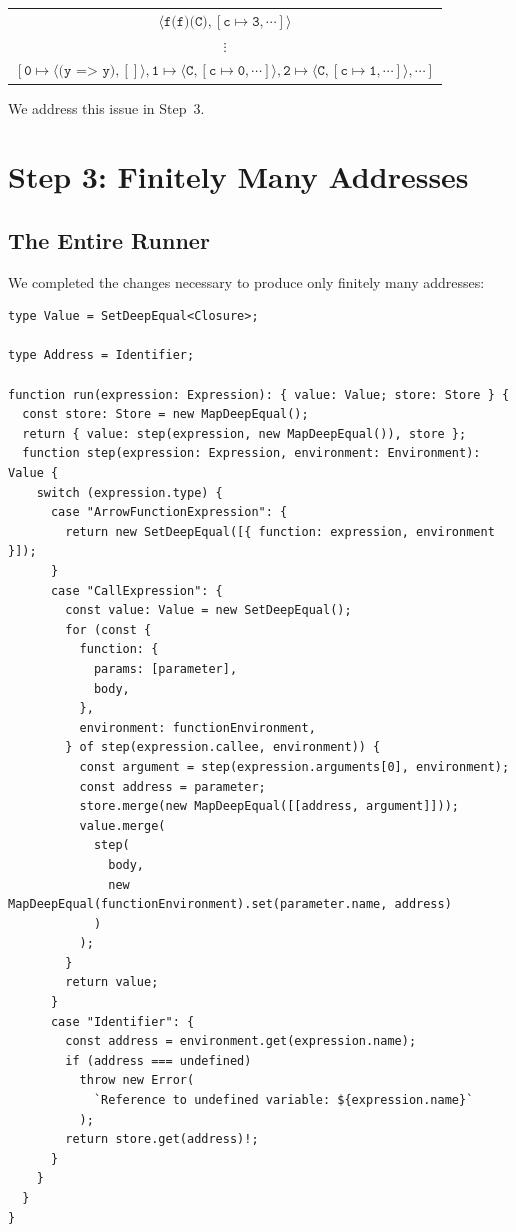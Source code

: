 \documentclass[12pt, oneside]{book}
\begin{document}
\begin{center}
\begin{tabular}{l}
\multicolumn{1}{c}{$\langle \texttt{f(f)(C)}, [\texttt{c} \mapsto \texttt{3}, \cdots] \rangle$} \\
\multicolumn{1}{c}{$\vdots$} \\
\multicolumn{1}{c}{$[\texttt{0} \mapsto \langle \texttt{(y => y)}, [] \rangle, \texttt{1} \mapsto \langle \texttt{C}, [\texttt{c} \mapsto \texttt{0}, \cdots] \rangle, \texttt{2} \mapsto \langle \texttt{C}, [\texttt{c} \mapsto \texttt{1}, \cdots] \rangle, \cdots]$}
\end{tabular}
\end{center}

We address this issue in Step~3.

\section{Step 3: Finitely Many Addresses}

\subsection{The Entire Runner}

We completed the changes necessary to produce only finitely many addresses:

\begin{verbatim}
type Value = SetDeepEqual<Closure>;

type Address = Identifier;

function run(expression: Expression): { value: Value; store: Store } {
  const store: Store = new MapDeepEqual();
  return { value: step(expression, new MapDeepEqual()), store };
  function step(expression: Expression, environment: Environment): Value {
    switch (expression.type) {
      case "ArrowFunctionExpression": {
        return new SetDeepEqual([{ function: expression, environment }]);
      }
      case "CallExpression": {
        const value: Value = new SetDeepEqual();
        for (const {
          function: {
            params: [parameter],
            body,
          },
          environment: functionEnvironment,
        } of step(expression.callee, environment)) {
          const argument = step(expression.arguments[0], environment);
          const address = parameter;
          store.merge(new MapDeepEqual([[address, argument]]));
          value.merge(
            step(
              body,
              new MapDeepEqual(functionEnvironment).set(parameter.name, address)
            )
          );
        }
        return value;
      }
      case "Identifier": {
        const address = environment.get(expression.name);
        if (address === undefined)
          throw new Error(
            `Reference to undefined variable: ${expression.name}`
          );
        return store.get(address)!;
      }
    }
  }
}
\end{verbatim}
\end{document}
